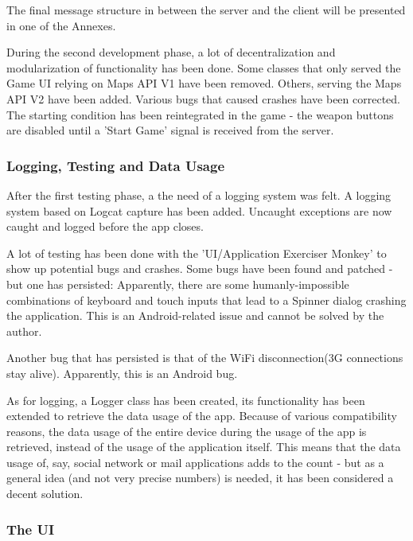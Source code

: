 The final message structure in between the server and the client will be
presented in one of the Annexes.\newline

During the second development phase, a lot of decentralization and
modularization of functionality has been done. Some classes that only served the
Game UI relying on Maps API V1 have been removed. Others, serving the Maps API
V2 have been added. Various bugs that caused crashes have been corrected. The
starting condition has been reintegrated in the game - the weapon buttons
are disabled until a 'Start Game' signal is received from the server.\newline

\subsubsection{Logging, Testing and Data Usage}
After the first testing phase, a the need of a logging system was felt. A
logging system based on Logcat capture has been added. Uncaught exceptions are
now caught and logged before the app closes. \newline

A lot of testing has been done with the 'UI/Application Exerciser Monkey' to
show up potential bugs and crashes. Some bugs have been found and patched - but
one has persisted: Apparently, there are some humanly-impossible combinations of
keyboard and touch inputs that lead to a Spinner dialog crashing the
application. This is an Android-related issue and cannot be solved by
the author.\newline

Another bug that has persisted is that of the WiFi disconnection(3G connections
stay alive). Apparently, this is an Android bug.\newline

As for logging, a Logger class has been created, its functionality has been
extended to retrieve the data usage of the app. Because of various compatibility
reasons, the data usage of the entire device during the usage of the app is
retrieved, instead of the usage of the application itself. This means that the
data usage of, say, social network or mail applications adds to the count - but as a
general idea (and not very precise numbers) is needed, it has been considered a
decent solution.

\subsubsection{The UI}

